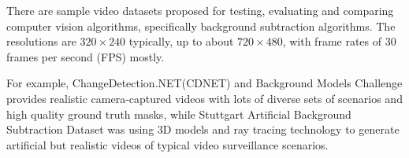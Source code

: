 There are sample video datasets proposed for testing, evaluating and comparing computer vision algorithms, specifically background subtraction algorithms. The resolutions are $320 \times 240$ typically, up to about $720 \times 480$, with frame rates of $30$ frames per second (FPS) mostly.

For example, ChangeDetection.NET(CDNET) \cite{goyette2012changedetection} and Background Models Challenge \cite{vacavant2012benchmark} provides realistic camera-captured videos with lots of diverse sets of scenarios and high quality ground truth masks, while Stuttgart Artificial Background Subtraction Dataset \cite{brutzer2011evaluation} was using 3D models and ray tracing technology to generate artificial but realistic videos of typical video surveillance scenarios.
